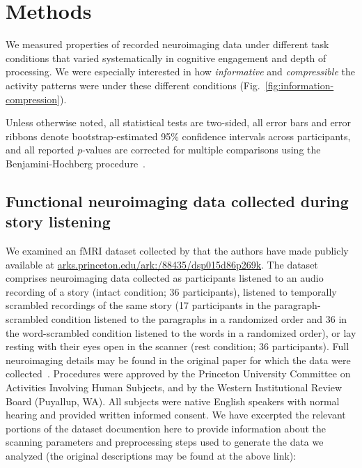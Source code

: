\documentclass[english, 11pt]{article}
\begin{document}
\section*{Methods}

We measured properties of recorded neuroimaging data under different task
conditions that varied systematically in cognitive engagement and depth of
processing. We were especially interested in how \textit{informative} and
\textit{compressible} the activity patterns were under these different
conditions (Fig.~\ref{fig:information-compression}).

Unless otherwise noted, all statistical tests are two-sided, all error bars and
error ribbons denote bootstrap-estimated 95\% confidence intervals across
participants, and all reported $p$-values are corrected for multiple
comparisons using the Benjamini-Hochberg procedure~\citep{BenjHoch95}.

\subsection*{Functional neuroimaging data collected during story
  listening}

We examined an fMRI dataset collected by \cite{SimoEtal16} that the authors
have made publicly available at
\href{http://arks.princeton.edu/ark:/88435/dsp015d86p269k}{arks.princeton.edu/ark:/88435/dsp015d86p269k}.
The dataset comprises neuroimaging data collected as participants listened to
an audio recording of a story (intact condition; 36 participants), listened to
temporally scrambled recordings of the same story (17 participants in the
paragraph-scrambled condition listened to the paragraphs in a randomized order
and 36 in the word-scrambled condition listened to the words in a randomized
order), or lay resting with their eyes open in the scanner (rest condition; 36
participants). Full neuroimaging details may be found in the original paper for
which the data were collected~\citep{SimoEtal16}. Procedures were approved by
the Princeton University Committee on Activities Involving Human Subjects, and
by the Western Institutional Review Board (Puyallup, WA). All subjects were
native English speakers with normal hearing and provided written informed
consent. We have excerpted the relevant portions of the dataset documention
here to provide information about the scanning parameters and preprocessing
steps used to generate the data we analyzed (the original descriptions may be
found at the above link):
\end{document}
